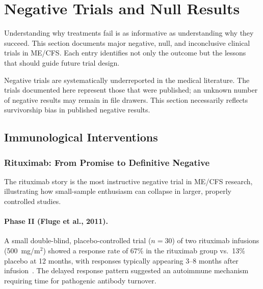 
\section{Negative Trials and Null Results}
\label{sec:negative-trials}

Understanding why treatments fail is as informative as understanding why they succeed. This section documents major negative, null, and inconclusive clinical trials in ME/CFS. Each entry identifies not only the outcome but the lessons that should guide future trial design.

\begin{limitation}
Negative trials are systematically underreported in the medical literature. The trials documented here represent those that were published; an unknown number of negative results may remain in file drawers. This section necessarily reflects survivorship bias in published negative results.
\end{limitation}

\subsection{Immunological Interventions}
\label{subsec:neg-immunological}

\subsubsection{Rituximab: From Promise to Definitive Negative}

The rituximab story is the most instructive negative trial in ME/CFS research, illustrating how small-sample enthusiasm can collapse in larger, properly controlled studies.

\paragraph{Phase II (Fluge et al., 2011).}
A small double-blind, placebo-controlled trial ($n = 30$) of two rituximab infusions (500~mg/m$^2$) showed a response rate of 67\% in the rituximab group vs.\ 13\% placebo at 12 months, with responses typically appearing 3--8 months after infusion~\cite{Fluge2011rituximab}. The delayed response pattern suggested an autoimmune mechanism requiring time for pathogenic antibody turnover.

